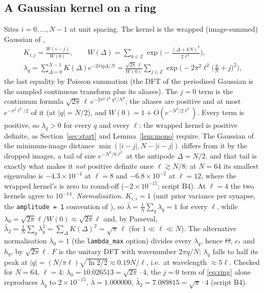 \documentclass[11pt,a4paper]{article}
\theoremstyle{remark}
\begin{document}
\subsection{A Gaussian kernel on a ring}
\label{sec:ring}
Sites $i = 0,\dots,N-1$ at unit spacing. The kernel is the wrapped (image-summed) Gaussian of ,
\begin{equation}
\begin{gathered}
  K_{i,j} = \frac{W(i-j)}{W(0)},\qquad W(\Delta) = \sum_{k\in\mathbb Z}\exp\!\Big(-\frac{(\Delta+kN)^2}{2\ell^2}\Big),\\
  \lambda_q = \sum_{\Delta=0}^{N-1}K(\Delta)e^{-2\pi\mathrm iq\Delta/N} = \frac{\sqrt{2\pi}\,\ell}{W(0)}\sum_{j\in\mathbb Z}\exp\!\Big(-2\pi^2\ell^2\Big(\frac qN + j\Big)^2\Big),
\end{gathered}
  \label{eq:ring}
\end{equation}
the last equality by Poisson summation (the DFT of the periodised Gaussian is the sampled continuous transform plus its aliases). The $j = 0$ term is the continuum formula $\sqrt{2\pi}\,\ell\,e^{-2\pi^2\ell^2q^2/N^2}$; the aliases are positive and at most $e^{-\pi^2\ell^2/2}$ of it (at $|q| = N/2$), and $W(0) = 1 + O(e^{-N^2/2\ell^2})$. Every term is positive, so $\lambda_q > 0$ for every $q$ and every $\ell$: the wrapped kernel is positive definite, as Section~\ref{sec:start} and Lemma~\ref{lem:mono} require. The Gaussian of the minimum-image distance $\min(|i-j|, N-|i-j|)$ differs from it by the dropped images, a tail of size $e^{-N^2/8\ell^2}$ at the antipode $\Delta = N/2$, and that tail is exactly what makes it \emph{not} positive definite once $\ell\gtrsim N/8$: at $N = 64$ its smallest eigenvalue is $-4.3\times10^{-4}$ at $\ell = 8$ and $-6.8\times10^{-2}$ at $\ell = 12$, where the wrapped kernel's is zero to round-off ($-2\times10^{-15}$; script B4). At $\ell = 4$ the two kernels agree to $10^{-14}$.
\emph{Normalisation.} $K_{i,i} = 1$ (unit prior variance per synapse, the \texttt{amplitude = 1} convention of ), so $\bar\lambda = \frac1N\sum_q\lambda_q = 1$ for every $\ell$, while $\lambda_0 = \sqrt{2\pi}\ell/W(0)\approx\sqrt{2\pi}\ell$ and, by Parseval, $\bar\lambda_2 = \frac1N\sum_q\lambda_q^2 = \sum_\Delta K(\Delta)^2 = \sqrt\pi\,\ell$ (for $1\ll\ell\ll N$). The alternative normalisation $\lambda_0 = 1$ (the \texttt{lambda\_max} option) divides every $\lambda_q$, hence $\Theta$, $c_*$ and $h_q$, by $\sqrt{2\pi}\ell$. $F$ is the unitary DFT with wavenumber $2\pi q/N$; $\lambda_q$ falls to half its peak at $|q| = (N/\pi\ell)\sqrt{\ln2/2}\approx0.19N/\ell$, i.e.\ at wavelength $\approx5\ell$. Checked for $N = 64$, $\ell = 4$: $\lambda_0 = 10.026513 = \sqrt{2\pi}\cdot4$, the $j = 0$ term of \eqref{eq:ring} alone reproduces $\lambda_q$ to $2\times10^{-15}$, $\bar\lambda = 1.000000$, $\bar\lambda_2 = 7.089815 = \sqrt\pi\cdot4$ (script B4).
\end{document}
